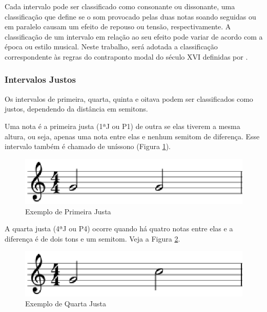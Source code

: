       Cada intervalo pode ser classificado como consonante ou dissonante, uma classificação que define se o som provocado pelas duas notas soando seguidas ou em paralelo causam um efeito de repouso ou tensão, respectivamente. A classificação de um intervalo em relação ao seu efeito pode variar de acordo com a época ou estilo musical. Neste trabalho, será adotada a classificação correspondente às regras do contraponto modal do século XVI definidas por .

      \subsubsection[Intervalos Justos]{Intervalos Justos}

        Os intervalos de primeira, quarta, quinta e oitava podem ser classificados como justos, dependendo da distância em semitons.

        Uma nota é a primeira justa (1ªJ ou P1\footnotemark {}) de outra se elas tiverem a mesma altura, ou seja, apenas uma nota entre elas e nenhum semitom de diferença. Esse intervalo também é chamado de uníssono (Figura \ref{primeirajusta}).

        \begin{figure}[htb]
          \centering
          \includegraphics[scale=0.6]{figuras/primeirajusta.eps}
          \caption{Exemplo de Primeira Justa}
          \label{primeirajusta}
        \end{figure}


        A quarta justa (4ªJ ou P4) ocorre quando há quatro notas entre elas e a diferença é de dois tons e um semitom. Veja a Figura \ref{quartajusta}.

        \begin{figure}[htb]
          \centering
          \includegraphics[scale=0.6]{figuras/quartajusta.eps}
          \caption{Exemplo de Quarta Justa}
          \label{quartajusta}
        \end{figure}


